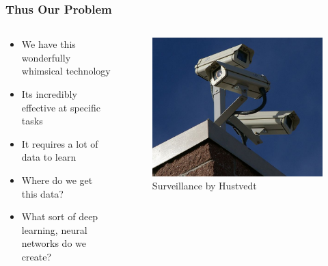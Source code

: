 \documentclass[aspectratio=169]{beamer}
\begin{document}
  \begin{frame}
    \frametitle{Thus Our Problem}
    \begin{columns}
      \begin{column}{0.5\textwidth}
        \begin{itemize}
          \item We have this wonderfully whimsical technology
          \item Its incredibly effective at specific tasks
          \item It requires a lot of data to learn
          \item Where do we get this data?
          \item What sort of deep learning, neural networks do we create?
        \end{itemize}
      \end{column}
      \begin{column}{0.5\textwidth}
        \begin{figure}[th!]
          \centering
          \includegraphics[width=1\textwidth]{surveillance.jpg}
          \caption{Surveillance by Hustvedt \autocite{cc}}
          \label{fig:jim_carrey}
        \end{figure}
      \end{column}
    \end{columns}
  \end{frame}
\end{document}
